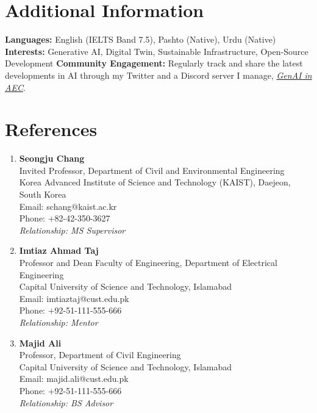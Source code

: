 \documentclass[a4paper,11pt]{article}
\begin{document}
\section{\textbf{Additional Information}}
\vspace{-0.4mm}
\small{
\textbf{Languages:} English (IELTS Band 7.5), Pashto (Native), Urdu (Native) \\
\textbf{Interests:} Generative AI, Digital Twin, Sustainable Infrastructure, Open-Source Development
\textbf{Community Engagement:} Regularly track and share the latest developments in AI through my Twitter and a Discord server I manage, \href{https://discord.gg/utdkMDEj}{\textit{GenAI in AEC}}.

}
\section{\textbf{References}}
\vspace{-0.2mm}
\small{
\begin{enumerate}[leftmargin=*,labelsep=2mm]
\item \textbf{Seongju Chang}\\
   Invited Professor, Department of Civil and Environmental Engineering\\
   Korea Advanced Institute of Science and Technology (KAIST), Daejeon, South Korea\\
   Email: schang@kaist.ac.kr\\
   Phone: +82-42-350-3627\\
   \textit{Relationship: MS Supervisor}
\item \textbf{Imtiaz Ahmad Taj}\\
   Professor and Dean Faculty of Engineering, Department of Electrical Engineering\\
   Capital University of Science and Technology, Islamabad\\
   Email: imtiaztaj@cust.edu.pk\\
   Phone: +92-51-111-555-666\\
   \textit{Relationship: Mentor}
\item \textbf{Majid Ali}\\
   Professor, Department of Civil Engineering\\
   Capital University of Science and Technology, Islamabad\\
   Email: majid.ali@cust.edu.pk\\
   Phone: +92-51-111-555-666\\
   \textit{Relationship: BS Advisor}
\end{enumerate}
}
\end{document}
